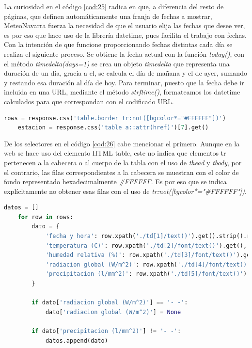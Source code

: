 La curiosidad en el código \ref{cod:25} radica en que, a diferencia del resto de páginas, que definen automáticamente una franja de fechas a mostrar, MeteoNavarra fuerza la necesidad de que el usuario elija las fechas que desee ver, es por eso que hace uso de la librería datetime, pues facilita el trabajo con fechas.\newline
\newline
Con la intención de que funcione proporcionando fechas distintas cada día se realiza el siguiente proceso. Se obtiene la fecha actual con la función \textit{today()}, con el método \textit{timedelta(days=1)} se crea un objeto \textit{timedelta} que representa una duración de un día, gracia a el, se calcula el día de mañana y el de ayer, sumando y restando esa duración al día de hoy. Para terminar, puesto que la fecha debe ir incluida en una URL, mediante el método \textit{strftime()}, formateamos los datetime calculados para que correspondan con el codificado URL.

\begin{lstlisting}[language=Python, caption={Selector en \textit{parse()} de MeteoNavarra Data Spider}, label=cod:26]
	rows = response.css('table.border tr:not([bgcolor*="#FFFFFF"])')
	estacion = response.css('table a::attr(href)')[7].get()
\end{lstlisting}

De los selectores en el código \ref{cod:26} cabe mencionar el primero. Aunque en la web se hace uso del elemento HTML table, este no indica que elementos tr pertenecen a la cabecera o al cuerpo de la tabla con el uso de \textit{thead} y \textit{tbody}, por el contrario, las filas correspondientes a la cabecera se muestran con el color de fondo representado hexadecimalmente \textit{\#FFFFFF}. Es por eso que se indica explícitamente no obtener esas filas con el uso de \textit{tr:not([bgcolor*="\#FFFFFF"])}.

\begin{lstlisting}[language=Python, caption={Trabajar sobre los datos de MeteoNavarra Data Spider}, label=cod:27]
	datos = []
	for row in rows:
		dato = {
			'fecha y hora': row.xpath('./td[1]/text()').get().strip().replace(' ', ' ') + ':00',
			'temperatura (C)': row.xpath('./td[2]/font/text()').get(),
			'humedad relativa (%)': row.xpath('./td[3]/font/text()').get(),
			'radiacion global (W/m^2)': row.xpath('./td[4]/font/text()').get(),
			'precipitacion (l/mm^2)': row.xpath('./td[5]/font/text()').get(),
		}
		
		if dato['radiacion global (W/m^2)'] == '- -':
			dato['radiacion global (W/m^2)'] = None
		
		if dato['precipitacion (l/mm^2)'] != '- -':
			datos.append(dato)
\end{lstlisting}


